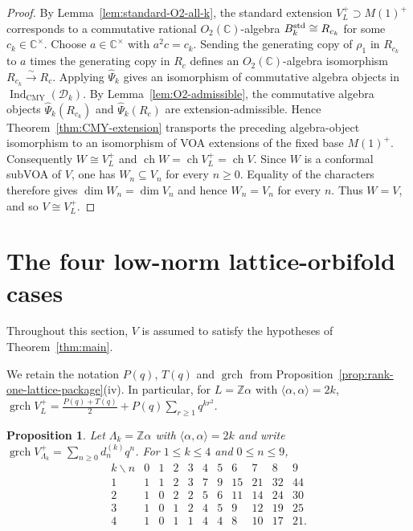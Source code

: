 \documentclass[12pt,leqno]{amsart}
\numberwithin{equation}{section} \newtheorem{thm}{Theorem}[section] \newtheorem{lem}[thm]{Lemma} \newtheorem{ex}[thm]{Example} \newtheorem{prop}[thm]{Proposition} \newtheorem{cor}[thm]{Corollary} \newtheorem{defi}[thm]{Definition} \newtheorem{rmk}[thm]{Remark} \newtheorem{notation}[thm]{Notation}
\newcommand{\ch}{\operatorname{ch}}
\newcommand{\grch}{\operatorname{grch}}
\newcommand{\Dk}{\mathcal D_k}
\newcommand{\IndCMY}{\operatorname{Ind}_{\mathrm{CMY}}}
\newcommand{\Otwo}{O_2(\C)}
\def\Z{\mathbb{Z}} \def\N{\mathbb{N}} \def\A{\mathbb{A}} \def\C{\mathbb{C}} \def\R{\mathbb{R}} \def\Q{\mathbb{Q}} \def\F{\mathbb{F}}
\begin{document}
\begin{proof}
By Lemma~\ref{lem:standard-O2-all-k}, the standard extension $V_L^+\supset M(1)^+$ corresponds to a commutative rational $\Otwo$-algebra \(B_k^{\rm std}\cong R_{c_k}\) for some $c_k\in\C^\times$. Choose $a\in\C^\times$ with $a^2c=c_k$. Sending the generating copy of $\rho_1$ in $R_{c_k}$ to $a$ times the generating copy in $R_c$ defines an $\Otwo$-algebra isomorphism \(R_{c_k}\overset\sim\longrightarrow R_c\). Applying $\widehat\Psi_k$ gives an isomorphism of commutative algebra objects in $\IndCMY(\Dk)$. By Lemma~\ref{lem:O2-admissible}, the commutative algebra objects $\widehat\Psi_k(R_{c_k})$ and $\widehat\Psi_k(R_c)$ are extension-admissible. Hence Theorem~\ref{thm:CMY-extension} transports the preceding algebra-object isomorphism to an isomorphism of VOA extensions of the fixed base $M(1)^+$. Consequently \(W\cong V_L^+\) and \(\ch W=\ch V_L^+=\ch V\). Since $W$ is a conformal subVOA of $V$, one has $W_n\subseteq V_n$ for every $n\ge0$. Equality of the characters therefore gives $\dim W_n=\dim V_n$ and hence $W_n=V_n$ for every $n$. Thus $W=V$, and so \(V\cong V_L^+.\)
\end{proof}

\section{The four low-norm lattice-orbifold cases}\label{sec:low}

Throughout this section, $V$ is assumed to satisfy the hypotheses of Theorem~\ref{thm:main}.

We retain the notation $P(q)$, $T(q)$ and $\grch$ from Proposition~\ref{prop:rank-one-lattice-package}(iv). In particular, for $L=\Z\alpha$ with $\langle\alpha,\alpha\rangle=2k$, \(\grch V_L^+=\frac{P(q)+T(q)}2+P(q)\sum_{r\ge1}q^{kr^2}.\)

\begin{prop}\label{prop:low-table}
Let $\Lambda_k=\Z\alpha$ with $\langle\alpha,\alpha\rangle=2k$ and write \(\grch V_{\Lambda_k}^+=\sum_{n\ge0}d_n^{(k)}q^n\). For $1\le k\le4$ and $0\le n\le9$,
\[
\begin{array}{c|rrrrrrrrrr}
 k\backslash n&0&1&2&3&4&5&6&7&8&9\\ \hline
1&1&1&2&3&7&9&15&21&32&44\\
2&1&0&2&2&5&6&11&14&24&30\\
3&1&0&1&2&4&5&9&12&19&25\\
4&1&0&1&1&4&4&8&10&17&21.
\end{array}
\]
\end{prop}
\end{document}

